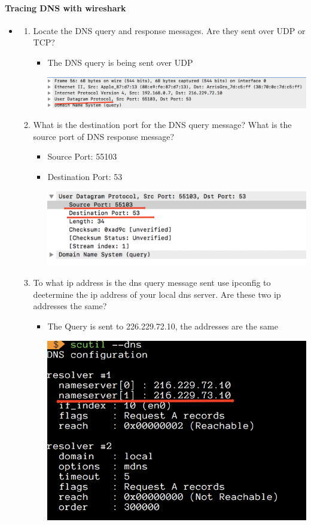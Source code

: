 \documentclass{article}
\begin{document}
\paragraph{Tracing DNS with wireshark}
\begin{itemize}
  \item\begin{enumerate}
    \item Locate the DNS query and response messages. Are they sent over UDP or TCP?
      \begin{itemize}
        \item The DNS query is being sent over UDP \par
        \includegraphics[scale=0.4]{images/DNS4.png}
      \end{itemize}
    \item What is the destination port for the DNS query message? What is the source port of DNS response message?
        \begin{itemize}
          \item Source Port: 55103
          \item Destination Port: 53\par
          \includegraphics[scale=0.5]{images/DNS5.png}
        \end{itemize}
    \item To what ip address is the dns query message sent use ipconfig to deetermine the ip address of your local dns server. Are these two ip addresses the same?
        \begin{itemize}
          \item The Query is sent to 226.229.72.10, the addresses are the same\par
          \includegraphics{images/DNS6.png}\par

\end{itemize}
\end{enumerate}
\end{itemize}
\end{document}
